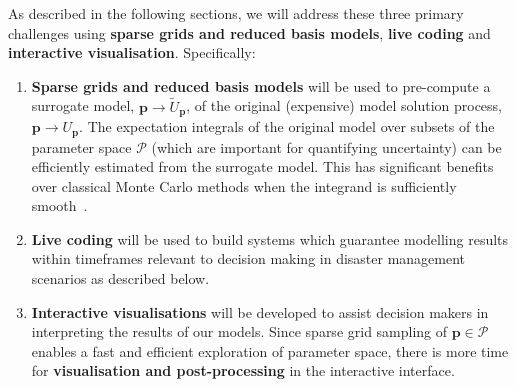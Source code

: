 As described in the following sections, we will address these {three primary challenges} using {\bf sparse grids and reduced basis models}, {\bf live coding} and {\bf interactive visualisation}. Specifically: 
\begin{enumerate}
\item {\bf Sparse grids and reduced basis models} will be used
  to pre-compute a surrogate model, $\mathbf{p} \rightarrow \tilde{U}_{\mathbf{p}}$, of the original
  (expensive) model solution process, $\mathbf{p} \rightarrow {U}_{\mathbf{p}}$.
  The expectation integrals of the original model over subsets of the
  parameter space $\mathcal{P}$ (which are important for quantifying
  uncertainty) can be efficiently estimated from the
  surrogate model. This has
  significant benefits over classical Monte Carlo methods when the
  integrand is sufficiently
  smooth~\parencite{JakemanRoberts2013,FranzelinDiehlPfluger2014}.

\item {\bf Live coding} will be used to build systems which guarantee modelling results within timeframes
relevant to decision making in disaster management scenarios as described below.




\item {\bf Interactive visualisations} will be developed to assist decision makers
in interpreting the results of our models. Since sparse grid sampling of
  $\mathbf{p}\in\mathcal{P}$ enables a fast and efficient exploration
  of parameter space, there is more time for {\bf visualisation and
  post-processing} in the interactive interface.
\end{enumerate}


